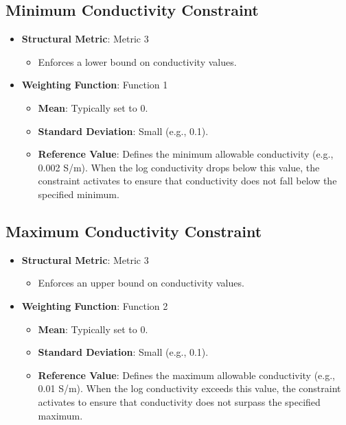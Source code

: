 \documentclass[a4paper,12pt]{article}
\begin{document}
\subsection{Minimum Conductivity Constraint}
\begin{itemize}
    \item \textbf{Structural Metric}: Metric 3
    \begin{itemize}
        \item Enforces a lower bound on conductivity values.
    \end{itemize}
    \item \textbf{Weighting Function}: Function 1
    \begin{itemize}
        \item \textbf{Mean}: Typically set to 0.
        \item \textbf{Standard Deviation}: Small (e.g., 0.1).
        \item \textbf{Reference Value}: Defines the minimum allowable conductivity (e.g., 0.002 S/m). When the log conductivity drops below this value, the constraint activates to ensure that conductivity does not fall below the specified minimum.
    \end{itemize}
\end{itemize}

\subsection{Maximum Conductivity Constraint}
\begin{itemize}
    \item \textbf{Structural Metric}: Metric 3
    \begin{itemize}
        \item Enforces an upper bound on conductivity values.
    \end{itemize}
    \item \textbf{Weighting Function}: Function 2
    \begin{itemize}
        \item \textbf{Mean}: Typically set to 0.
        \item \textbf{Standard Deviation}: Small (e.g., 0.1).
        \item \textbf{Reference Value}: Defines the maximum allowable conductivity (e.g., 0.01 S/m). When the log conductivity exceeds this value, the constraint activates to ensure that conductivity does not surpass the specified maximum.
    \end{itemize}
\end{itemize}
\end{document}
